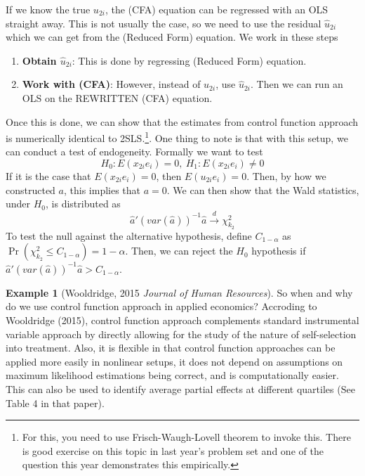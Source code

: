\documentclass[12pt]{article}
\theoremstyle{definition}
\theoremstyle{property}
\theoremstyle{assumption}
\theoremstyle{example}
\newtheorem{example}{Example}[section]
\theoremstyle{comment}
\begin{document}
If we know the true $u_{2i}$, the (CFA) equation can be regressed with an OLS straight away. This is not usually the case, so we need to use the residual $\hat{u}_{2i}$ which we can get from the (Reduced Form) equation. We work in these steps
\begin{enumerate}
\item \textbf{Obtain $\hat{u}_{2i}$}: This is done by regressing (Reduced Form) equation. 
\item \textbf{Work with (CFA)}: However, instead of $u_{2i}$, use $\hat{u}_{2i}$. Then we can run an OLS on the REWRITTEN (CFA) equation. 
\end{enumerate}\par
Once this is done, we can show that the estimates from control function approach is numerically identical to 2SLS.\footnote{For this, you need to use Frisch-Waugh-Lovell theorem to invoke this. There is good exercise on this topic in last year's problem set and one of the question this year demonstrates this empirically.}. 
One thing to note is that with this setup, we can conduct a test of endogeneity. Formally we want to test
\[
H_0: E(x_{2i}e_i)=0, \ H_1:E(x_{2i}e_i)\neq0
\]
If it is the case that $E(x_{2i}e_i)=0$, then $E(u_{2i}e_i)=0$. Then, by how we constructed $a$, this implies that $a=0$. We can then show that the Wald statistics, under $H_0$, is distributed as
\[
\hat{a}'(var(\hat{a}))^{-1}\hat{a}\xrightarrow{d}\chi^2_{k_2}
\]
To test the null against the alternative hypothesis, define $C_{1-\alpha}$ as $\Pr(\chi_{k_2}^2\leq C_{1-\alpha})=1-\alpha$. Then, we can reject the $H_0$ hypothesis if $\hat{a}'(var(\hat{a}))^{-1}\hat{a}>C_{1-\alpha}$.

\begin{mdframed}[backgroundcolor=yellow!5] 
\begin{example}[Wooldridge, 2015 \textit{Journal of Human Resources}] So when and why do we use control function approach in applied economics? Accroding to Wooldridge (2015), control function approach complements standard instrumental variable approach by directly allowing for the study of the nature of self-selection into treatment. Also, it is flexible in that control function approaches can be applied more easily in nonlinear setups, it does not depend on assumptions on maximum likelihood estimations being correct, and is computationally easier.  This can also be used to identify average partial effects at different quartiles (See Table 4 in that paper). 
\end{example}
\end{mdframed}
\end{document}
